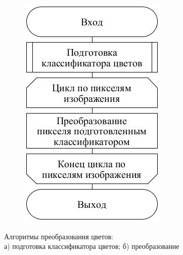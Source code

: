 \documentclass[t]{beamer}
\begin{document}
\begin{frame}
\begin{figure}[ht!]
\begin{subfigure}{.22\textwidth}
				\includegraphics[width = \textwidth]{image/chapter_2/colorclassification2}
				\vspace*{-0.6cm}
				\caption{}
			\end{subfigure}
			\centering
			\vspace*{-0.3cm}
			\caption{Алгоритмы преобразования цветов:\\ а) подготовка классификатора цветов; б) преобразование}
			\label{fig:Examples}
		\end{figure}
		
	\end{frame}
\end{document}
